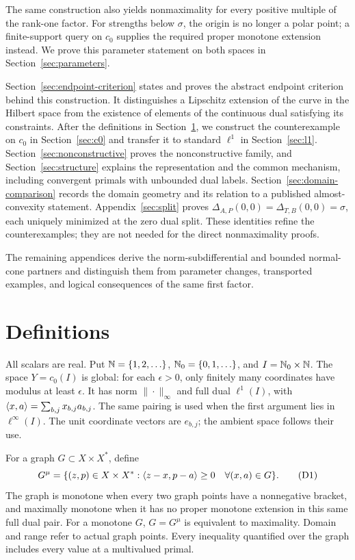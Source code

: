 The same construction also yields nonmaximality for every positive
multiple of the rank-one factor. For strengths below $\sigma$, the origin
is no longer a polar point; a finite-support query on $c_0$ supplies the required
proper monotone extension instead. We prove this parameter statement
on both spaces in Section~\ref{sec:parameters}.

Section~\ref{sec:endpoint-criterion} states and proves the abstract
endpoint criterion behind this construction. It distinguishes a Lipschitz
extension of the curve in the Hilbert space from the existence of elements
of the continuous dual satisfying its constraints.
After the definitions in Section~\ref{sec:definitions}, we construct the
counterexample on $c_0$ in Section~\ref{sec:c0} and transfer it to standard
$\ell^1$ in Section~\ref{sec:l1}.
Section~\ref{sec:nonconstructive} proves the nonconstructive family,
and Section~\ref{sec:structure} explains the representation and the
common mechanism, including convergent primals with unbounded dual labels.
Section~\ref{sec:domain-comparison} records the domain geometry and its
relation to a published almost-convexity statement.
Appendix~\ref{sec:split} proves
$\Delta_{A,P}(0,0)=\Delta_{T,B}(0,0)=\sigma$, each uniquely minimized
at the zero dual split. These identities refine the counterexamples;
they are not needed for the direct nonmaximality proofs.

The remaining appendices derive the norm-subdifferential and bounded
normal-cone partners and distinguish them from parameter changes,
transported examples, and logical consequences of the same first factor.



\section{Definitions}
\label{sec:definitions}
All scalars are real. Put $\mathbb N=\{1,2,\ldots\}$, $\mathbb N_0=\{0,1,\ldots\}$,
and $I=\mathbb N_0\times\mathbb N$. The space $Y=c_0(I)$ is global: for each
$\epsilon>0$, only finitely many coordinates have modulus at least
$\epsilon$. It has norm $\|\cdot\|_\infty$ and full dual $\ell^1(I)$,
with $\langle x,a\rangle=\sum_{b,j}x_{b,j}a_{b,j}$.
The same pairing is used when the first argument lies in $\ell^\infty(I)$.
The unit coordinate vectors are $e_{b,j}$; the ambient space follows their use.

For a graph $G\subset X\times X^*$, define
\begin{equation}
G^\mu=\{(z,p)\in X\times X^*:
 \langle z-x,p-a\rangle\ge0\quad\forall(x,a)\in G\}.
\tag{D1}\label{eq:D1}
\end{equation}
The graph is monotone when every two graph points have a nonnegative bracket,
and maximally monotone when it has no proper monotone extension in this same
full dual pair. For a monotone $G$, $G=G^\mu$ is equivalent to maximality.
Domain and range refer to actual graph points. Every inequality quantified
over the graph includes every value at a multivalued primal.



